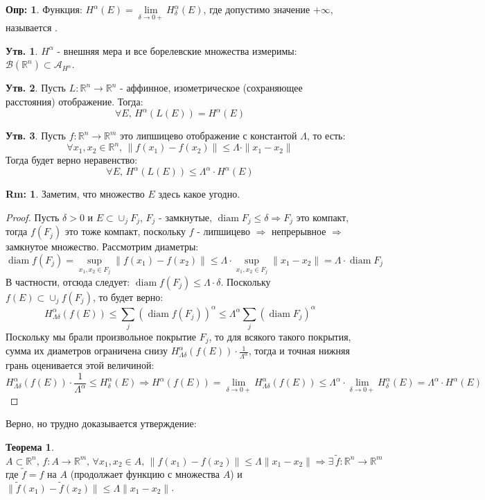 \documentclass[12pt]{article}
\newcommand{\MR}{\mathbb{R}}
\newcommand{\MA}{\mathcal{A}}
\newcommand{\MB}{\mathcal{B}}
\theoremstyle{definition}
\newtheorem{defn}{Опр:}
\newtheorem{rem}{Rm:}
\newtheorem{prop}{Утв.}
\newtheorem{theorem}{Теорема}
\DeclareMathOperator{\diam}{\text{diam}}
\newcommand{\ddsum}[2]{\displaystyle\sum\limits_{#1}^{#2}}
\newcommand{\wte}[1]{\widetilde{#1}}
\begin{document}
\begin{defn}
	Функция: $H^\alpha(E) = \lim\limits_{\delta \to 0+} H_\delta^\alpha(E)$, где допустимо значение $+\infty$, называется .
\end{defn}
\begin{prop}
	$H^\alpha$ - внешняя мера и все борелевские множества измеримы: $\MB(\MR^n) \subset \MA_{H^\alpha}$.
\end{prop}
\begin{prop}
	Пусть $L \colon \MR^n \to \MR^n$ - аффинное, изометрическое (сохраняющее расстояния) отображение. Тогда: 
	$$
		\forall E, \, H^\alpha(L(E)) = H^\alpha(E)
	$$
\end{prop}
\begin{prop}
	Пусть $f \colon \MR^n \to \MR^m$ это липшицево отображение с константой $\Lambda$, то есть:
	$$
		\forall x_1, x_2 \in \MR^n, \, \|f(x_1) - f(x_2)\| \leq \Lambda{\cdot}\|x_1 - x_2\|
	$$
	Тогда будет верно неравенство: 
	$$
		\forall E, \, H^\alpha(L(E)) \leq \Lambda^\alpha{\cdot} H^\alpha(E)
	$$
\end{prop}
\begin{rem}
	Заметим, что множество $E$ здесь какое угодно.
\end{rem}
\begin{proof}
	Пусть $\delta > 0$ и $E \subset \cup_j F_j$, $F_j$ - замкнутые, $\diam{F_j} \leq \delta \Rightarrow F_j$ это компакт, тогда $f(F_j)$ это тоже компакт, поскольку $f$ - липшицево $\Rightarrow$ непрерывное  $\Rightarrow$ замкнутое множество. Рассмотрим диаметры:
	$$
		\diam{f(F_j)} = \sup\limits_{x_1,x_2 \in F_j}\|f(x_1) - f(x_2)\| \leq \Lambda{\cdot}\sup\limits_{x_1,x_2 \in F_j}\|x_1 - x_2\| = \Lambda {\cdot}\diam{F_j}
	$$
	В частности, отсюда следует: $\diam{f(F_j)} \leq \Lambda {\cdot} \delta$. Поскольку $f(E) \subset \cup_j f(F_j)$, то будет верно:
	$$
		H_{\Lambda \delta}^\alpha(f(E)) \leq \ddsum{j}{}(\diam{f(F_j)})^\alpha \leq \Lambda^\alpha \ddsum{j}{}(\diam{F_j})^\alpha
	$$
	Поскольку мы брали произвольное покрытие $F_j$, то для всякого такого покрытия, сумма их диаметров ограничена снизу $H_{\Lambda \delta}^\alpha(f(E)){\cdot}\tfrac{1}{\Lambda^\alpha}$, тогда и точная нижняя грань оценивается этой величиной:
	$$
		H_{\Lambda \delta}^\alpha(f(E)){\cdot}\dfrac{1}{\Lambda^\alpha} \leq H_\delta^\alpha(E)  \Rightarrow H^\alpha(f(E)) = \lim\limits_{\delta \to 0+}H_{\Lambda \delta}^\alpha(f(E)) \leq \Lambda^\alpha{\cdot}\lim\limits_{\delta \to 0+}H_{\delta}^\alpha(E) = \Lambda^\alpha{\cdot}H^\alpha(E)
	$$
\end{proof}
Верно, но трудно доказывается утверждение:
\begin{theorem}
	$$
		A \subset \MR^n , \, f \colon A \to \MR^m, \, \forall x_1,x_2 \in A,\, \|f(x_1) - f(x_2)\| \leq \Lambda \|x_1 - x_2\| \Rightarrow \exists \, \wte{f} \colon \MR^n \to \MR^m
	$$
	где $\wte{f} = f$ на $A$ (продолжает функцию с множества $A$) и $\|\wte{f}(x_1) - \wte{f}(x_2)\| \leq \Lambda \|x_1 - x_2\|$. 
\end{theorem}
	
\end{document}

